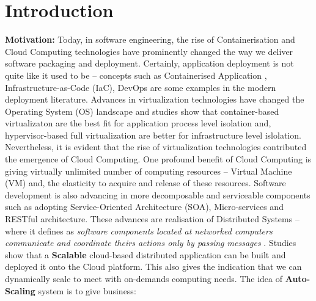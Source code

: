 
\chapter{Introduction} %

\label{Chapter1} %


\newcommand{\keyword}[1]{\textbf{#1}}
\newcommand{\tabhead}[1]{\textbf{#1}}
\newcommand{\code}[1]{\texttt{#1}}
\newcommand{\file}[1]{\texttt{\bfseries#1}}
\newcommand{\option}[1]{\texttt{\itshape#1}}



\textbf{Motivation:} \quad Today, in software engineering, the rise of Containerisation \parencite{Scheepers2014VirtualizationAC} and Cloud Computing \parencite{Armbrust:2010:VCC:1721654.1721672} technologies have prominently changed the way we deliver  software packaging and deployment. Certainly, application deployment is not quite like it used to be -- concepts such as Containerised Application \parencite{Merkel:2014:DLL:2600239.2600241}, Infrastructure-as-Code (IaC), DevOps \parencite{httermann2012devops} are some examples in the modern deployment literature. Advances in virtualization technologies have changed the Operating System (OS) landscape and studies \parencite{Kozhirbayev2017APC} \parencite{5708625} show that container-based virtualizaton are the best fit for application process level isolation and, hypervisor-based full virtualization are better for infrastructure level islolation. Nevertheless, it is evident that the rise of virtualization technologies contributed the emergence of Cloud Computing. One profound benefit of Cloud Computing is giving virtually unlimited number of computing resources -- Virtual Machine (VM) and, the elasticity to acquire and release of these resources. Software development is also advancing in more decomposable and serviceable components such as adopting Service-Oriented Architecture (SOA), Micro-services and RESTful architecture. These advances are realisation of Distributed Systems -- where it defines as \textit{software components located at networked computers communicate and coordinate theirs actions only by passing messages} \parencite{Coulouris:2011:DSC:2029110}. Studies \parencite{Sinnott:2016:SCS:3008079.3008128} show that a \textbf{Scalable} cloud-based distributed application can be built and deployed it onto the Cloud platform. This also gives the indication that we can dynamically scale to meet with on-demands computing needs. The idea of \textbf{Auto-Scaling} system is to give business:

